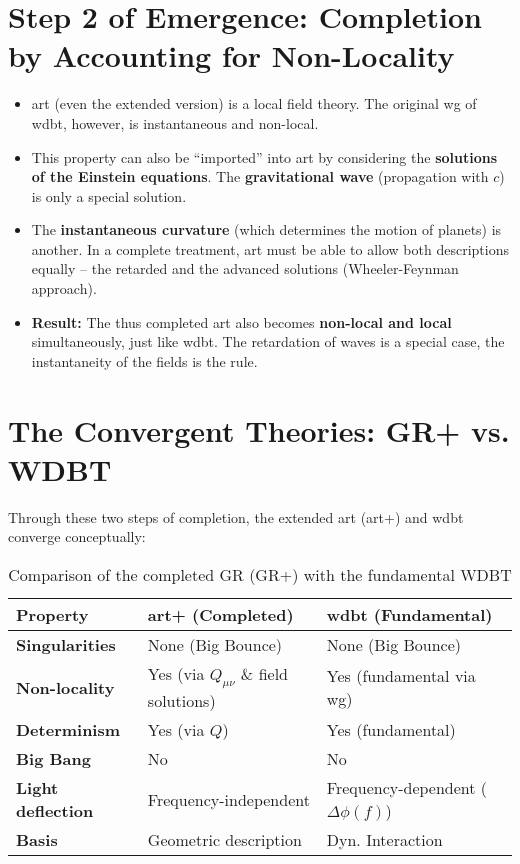 \section{Step 2 of Emergence: Completion by Accounting for Non-Locality}

\begin{itemize}
    \item \gls{art} (even the extended version) is a local field theory. The original \gls{wg} of \gls{wdbt}, however, is instantaneous and non-local.
    \item This property can also be \enquote{imported} into \gls{art} by considering the \textbf{solutions of the Einstein equations}. The \textbf{gravitational wave} (propagation with $c$) is only a special solution.
    \item The \textbf{instantaneous curvature} (which determines the motion of planets) is another. In a complete treatment, \gls{art} must be able to allow both descriptions equally – the retarded and the advanced solutions (Wheeler-Feynman approach).
    \item \textbf{Result:} The thus completed \gls{art} also becomes \textbf{non-local and local} simultaneously, just like \gls{wdbt}. The retardation of waves is a special case, the instantaneity of the fields is the rule.
\end{itemize}

\section{The Convergent Theories: GR+ vs. WDBT}
Through these two steps of completion, the extended \gls{art} (\gls{art}+) and \gls{wdbt} converge conceptually:

\begin{table}[h]
\centering
\begin{tabular}{|p{}|p{}|p{}|}
\hline
\textbf{Property} & \textbf{\gls{art}+ (Completed)} & \textbf{\gls{wdbt} (Fundamental)} \\
\hline
\textbf{Singularities} & None (Big Bounce) & None (Big Bounce) \\
\hline
\textbf{Non-locality} & Yes (via $Q_{\mu\nu}$ \& field solutions) & Yes (fundamental via \gls{wg}) \\
\hline
\textbf{Determinism} & Yes (via $Q$) & Yes (fundamental) \\
\hline
\textbf{Big Bang} & No & No \\
\hline
\textbf{Light deflection} & Frequency-independent & Frequency-dependent ($\Delta \phi(f)$) \\
\hline
\textbf{Basis} & Geometric description & Dyn. Interaction \\
\hline
\end{tabular}
\caption{Comparison of the completed GR (GR+) with the fundamental WDBT}
\end{table}

